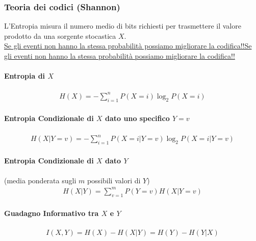 \documentclass[a4paper,12pt]{article}
\let\mathunderline\underline
\renewcommand{\underline}[1]{\ifmmode\mathunderline{#1}\else\uline{#1}\fi}   %
\begin{document}
\subsubsection*{Teoria dei codici (Shannon)}
L'Entropia misura il numero medio di bits richiesti per trasmettere il valore prodotto da una sorgente stocastica $X$. \\
\underline{Se gli eventi non hanno la stessa probabilità possiamo migliorare la codifica!!}

\paragraph{Entropia di $X$}
\begin{align*}
    H(X) = -\sum_{i=1}^{n} P(X=i)\log_2 P(X=i)
\end{align*}

\paragraph{Entropia Condizionale di $X$ dato uno specifico $Y=v$}
\begin{align*}
    H(X|Y=v) = -\sum_{i=1}^{n} P(X=i|Y=v)\log_2 P(X=i|Y=v)
\end{align*}

\paragraph{Entropia Condizionale di $X$ dato $Y$}
(media ponderata sugli $m$ possibili valori di $Y$)
\begin{align*}
    H(X|Y) = \sum_{v=1}^{m} P(Y=v)H(X|Y=v)
\end{align*}

\paragraph{Guadagno Informativo tra $X$ e $Y$}
\begin{align*}
    I(X,Y) = H(X)-H(X|Y) = H(Y)-H(Y|X)
\end{align*}
\end{document}
